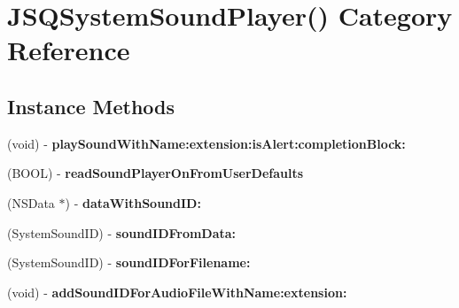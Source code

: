 \hypertarget{category_j_s_q_system_sound_player_07_08}{}\section{J\+S\+Q\+System\+Sound\+Player() Category Reference}
\label{category_j_s_q_system_sound_player_07_08}
\subsection*{Instance Methods}
\begin{DoxyCompactItemize}
\item 
\hypertarget{category_j_s_q_system_sound_player_07_08_a54e02cdd879ad3ccc30d38dba7b6c7e7}{}(void) -\/ {\bfseries play\+Sound\+With\+Name\+:extension\+:is\+Alert\+:completion\+Block\+:}\label{category_j_s_q_system_sound_player_07_08_a54e02cdd879ad3ccc30d38dba7b6c7e7}

\item 
\hypertarget{category_j_s_q_system_sound_player_07_08_aa956aa90807f2e9f07531dfd4bc5ea99}{}(B\+O\+O\+L) -\/ {\bfseries read\+Sound\+Player\+On\+From\+User\+Defaults}\label{category_j_s_q_system_sound_player_07_08_aa956aa90807f2e9f07531dfd4bc5ea99}

\item 
\hypertarget{category_j_s_q_system_sound_player_07_08_ae852a6239b4c8573c685929eeecd9785}{}(N\+S\+Data $\ast$) -\/ {\bfseries data\+With\+Sound\+I\+D\+:}\label{category_j_s_q_system_sound_player_07_08_ae852a6239b4c8573c685929eeecd9785}

\item 
\hypertarget{category_j_s_q_system_sound_player_07_08_a733b40fd578e80e2521f8b7e31e64631}{}(System\+Sound\+I\+D) -\/ {\bfseries sound\+I\+D\+From\+Data\+:}\label{category_j_s_q_system_sound_player_07_08_a733b40fd578e80e2521f8b7e31e64631}

\item 
\hypertarget{category_j_s_q_system_sound_player_07_08_aed09b48c94b47d0b982c5b27eb66fc87}{}(System\+Sound\+I\+D) -\/ {\bfseries sound\+I\+D\+For\+Filename\+:}\label{category_j_s_q_system_sound_player_07_08_aed09b48c94b47d0b982c5b27eb66fc87}

\item 
\hypertarget{category_j_s_q_system_sound_player_07_08_ac83cf61545f2100a6ddef03cd3b88e23}{}(void) -\/ {\bfseries add\+Sound\+I\+D\+For\+Audio\+File\+With\+Name\+:extension\+:}\label{category_j_s_q_system_sound_player_07_08_ac83cf61545f2100a6ddef03cd3b88e23}


\end{DoxyCompactItemize}
